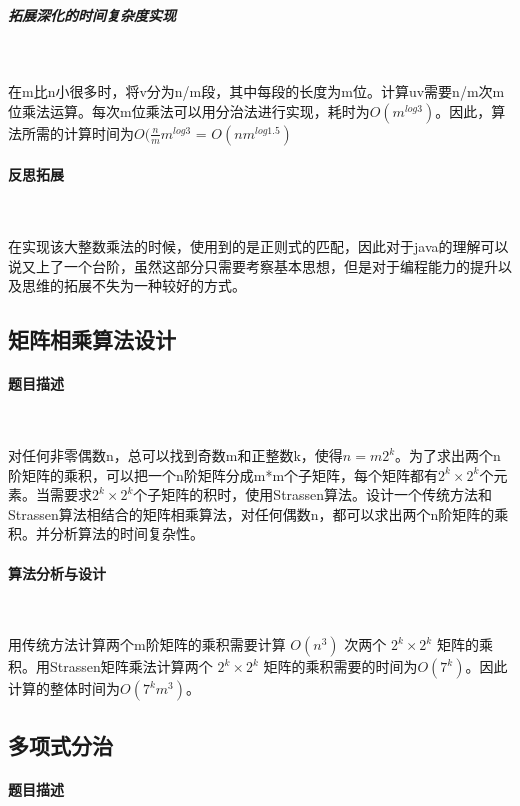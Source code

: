 \documentclass[UTF8]{ctexart}
\begin{document}
    \subparagraph{拓展深化的时间复杂度实现}

    ~

    在m比n小很多时，将v分为n/m段，其中每段的长度为m位。计算uv需要n/m次m位乘法运算。每次m位乘法可以用分治法进行实现，耗时为$O(m^ {log3})$。因此，算法所需的计算时间为$O(\frac{n}{m}m^{log3}$ = $O(nm^{log1.5})$

    \paragraph{反思拓展}

    ~

    在实现该大整数乘法的时候，使用到的是正则式的匹配，因此对于java的理解可以说又上了一个台阶，虽然这部分只需要考察基本思想，但是对于编程能力的提升以及思维的拓展不失为一种较好的方式。

    \subsection{矩阵相乘算法设计}

    \paragraph{题目描述}

    ~

    对任何非零偶数n，总可以找到奇数m和正整数k，使得$n=m2^k$。为了求出两个n阶矩阵的乘积，可以把一个n阶矩阵分成m*m个子矩阵，每个矩阵都有$2^k\times2^k$个元素。当需要求$2^k\times2^k$个子矩阵的积时，使用Strassen算法。设计一个传统方法和Strassen算法相结合的矩阵相乘算法，对任何偶数n，都可以求出两个n阶矩阵的乘积。并分析算法的时间复杂性。

    \paragraph{算法分析与设计}

    ~

    用传统方法计算两个m阶矩阵的乘积需要计算 $O(n^3)$ 次两个 $2^k\times2^k$ 矩阵的乘积。用Strassen矩阵乘法计算两个 $2^k\times2^k$ 矩阵的乘积需要的时间为$O(7^k)$。因此计算的整体时间为$O(7^k m^3)$。

    \subsection{多项式分治}

    \paragraph{题目描述}
\end{document}

